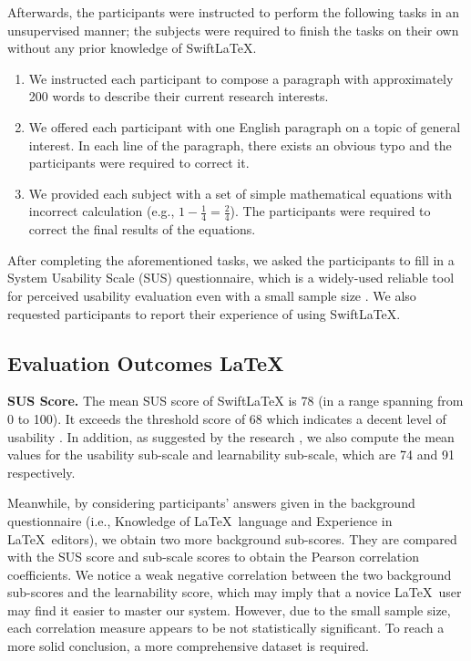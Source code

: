 \documentclass[sigconf]{acmart}
\begin{document}
Afterwards, the participants were instructed to perform the following tasks in an unsupervised manner; the subjects were required to finish the tasks on their own without any prior knowledge of SwiftLaTeX.
\begin{enumerate}
	\item We instructed each participant to compose a paragraph with approximately 200 words to describe their current research interests. 
	\item We offered each participant with one English paragraph on a topic of general interest. In each line of the paragraph, there exists an obvious typo and the participants were required to correct it.
	\item We provided each subject with a set of simple mathematical equations with incorrect calculation (e.g., $1 - \frac{1}{4} = \frac{2}{4}$). The participants were required to correct the final results of the equations.
\end{enumerate}

After completing the aforementioned tasks, we asked the participants to fill in a System Usability Scale (SUS) questionnaire, which is a widely-used reliable tool for perceived usability evaluation even with a small sample size \cite{brooke1996sus}.
We also requested participants to report their experience of using SwiftLaTeX.

\subsection{Evaluation Outcomes \LaTeX{}}


\textbf{SUS Score.}
The mean SUS score of SwiftLaTeX is 78 (in a range spanning from 0 to 100). It exceeds the threshold score of 68 which  indicates a decent level of usability \cite{brooke1996sus}. 
In addition, as suggested by the research \cite{lewis2009factor}, we also compute the mean values for the usability sub-scale and learnability sub-scale, which are 74 and 91 respectively. 

Meanwhile, by considering participants' answers given in the background questionnaire (i.e., Knowledge of \LaTeX\ language and Experience in \LaTeX\ editors), we obtain two more background sub-scores.
They are compared with the SUS score and sub-scale scores to obtain the Pearson correlation coefficients. 
We notice a weak negative correlation between the two background sub-scores and the learnability score, which may imply that a novice \LaTeX\ user may find it easier to master our system.
However, due to the small sample size, each correlation measure appears to be not statistically significant. To reach a more solid conclusion, a more comprehensive dataset is required.
\end{document}
